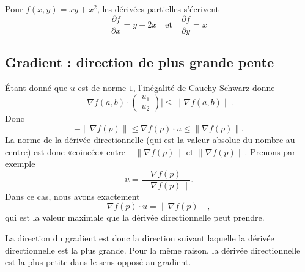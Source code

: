 \begin{example}
	Pour \( f(x,y) = xy + x^2\), les dérivées partielles
	s'écrivent
	\begin{equation*}
		\frac{\partial f}{\partial x} = y + 2x \quad\text{et}\quad \frac{\partial f}{\partial y} = x
	\end{equation*}
\end{example}



\subsection{Gradient : direction de plus grande pente}

Étant donné que \( u\) est de norme \( 1\), l'inégalité de Cauchy-Schwarz donne
\begin{equation}
	\big| \nabla f(a,b)\cdot \begin{pmatrix}
		u_1 \\
		u_2
	\end{pmatrix}\big|\leq \| \nabla f(a,b) \|.
\end{equation}
Donc
\begin{equation}
	-\| \nabla f(p) \|\leq \nabla f(p)\cdot u\leq\| \nabla f(p) \|.
\end{equation}
La norme de la dérivée directionnelle (qui est la valeur absolue du nombre au centre) est donc «coincée» entre \( -\| \nabla f(p) \|\) et \( \| \nabla f(p) \|\). Prenons par exemple
\begin{equation}
	u=\frac{ \nabla f(p) }{ \| \nabla f(p) \| }.
\end{equation}
Dans ce cas, nous avons exactement
\begin{equation}
	\nabla f(p)\cdot u=\| \nabla f(p) \|,
\end{equation}
qui est la valeur maximale que la dérivée directionnelle peut prendre.

La direction du gradient est donc la direction suivant laquelle la dérivée directionnelle est la plus grande. Pour la même raison, la dérivée directionnelle est la plus petite dans le sens opposé au gradient.

